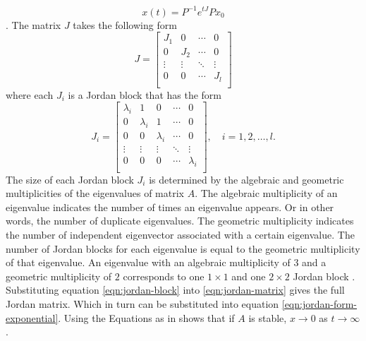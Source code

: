 \begin{equation}\label{eqn:jordan-form-exponential}
    x(t) = P^{-1}e^{tJ}Px_0
\end{equation}
\cite[Section 7.3]{Hespanha2018LinearTheory}. The matrix $J$ takes the following form
\begin{equation}\label{eqn:jordan-matrix}
    J =
    \begin{bmatrix}
        J_1 & 0 & \cdots & 0 \\
        0 & J_2 & \cdots & 0 \\
        \vdots & \vdots & \ddots & \vdots \\
        0 & 0 & \cdots & J_l \\
    \end{bmatrix}
\end{equation}
where each $J_i$ is a Jordan block that has the form
\begin{equation}\label{eqn:jordan-block}
    J_i = 
    \begin{bmatrix}
        \lambda_i & 1 & 0 & \cdots & 0 \\
        0 & \lambda_i & 1 & \cdots & 0 \\
        0 & 0 & \lambda_i & \cdots & 0 \\
        \vdots & \vdots & \vdots & \ddots & \vdots \\
        0 & 0 & 0 & \cdots & \lambda_i \\
    \end{bmatrix}, \quad i=1,2,\dots,l.
\end{equation}
The size of each Jordan block $J_i$ is determined by the algebraic and geometric multiplicities of the eigenvalues of matrix $A$. The algebraic multiplicity of an eigenvalue indicates the number of times an eigenvalue appears. Or in other words, the number of duplicate eigenvalues. The geometric multiplicity indicates the number of independent eigenvector associated with a certain eigenvalue. The number of Jordan blocks for each eigenvalue is equal to the geometric multiplicity of that eigenvalue. An eigenvalue with an algebraic multiplicity of $3$ and a geometric multiplicity of $2$ corresponds to one $1 \times 1$ and one $2 \times 2$ Jordan block \cite[Section 7.1] {Hespanha2018LinearTheory}. Substituting equation \eqref{eqn:jordan-block} into \eqref{eqn:jordan-matrix} gives the full Jordan matrix. Which in turn can be substituted into equation \eqref{eqn:jordan-form-exponential}. Using the Equations as in \cite[Section 7.3]{Hespanha2018LinearTheory} shows that if $A$ is stable, $x \rightarrow 0$ as $t \rightarrow \infty$.

